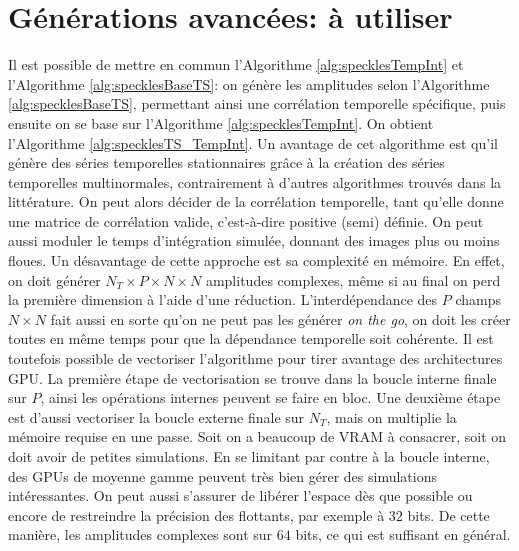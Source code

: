\documentclass[MSc,french]{ulthese}
\begin{document}
\section{Générations avancées: à utiliser}
Il est possible de mettre en commun l'Algorithme \ref{alg:specklesTempInt} et l'Algorithme \ref{alg:specklesBaseTS}: on génère les amplitudes selon l'Algorithme \ref{alg:specklesBaseTS}, permettant ainsi une corrélation temporelle spécifique, puis ensuite on se base sur l'Algorithme \ref{alg:specklesTempInt}. On obtient l'Algorithme \ref{alg:specklesTS_TempInt}. Un avantage de cet algorithme est qu'il génère des séries temporelles stationnaires grâce à la création des séries temporelles multinormales, contrairement à d'autres algorithmes trouvés dans la littérature. On peut alors décider de la corrélation temporelle, tant qu'elle donne une matrice de corrélation valide, c'est-à-dire positive (semi) définie. On peut aussi moduler le temps d'intégration simulée, donnant des images plus ou moins floues. Un désavantage de cette approche est sa complexité en mémoire. En effet, on doit générer $N_T \times P \times N \times N$ amplitudes complexes, même si au final on perd la première dimension à l'aide d'une réduction. L'interdépendance des $P$ champs $N\times N$ fait aussi en sorte qu'on ne peut pas les générer \textit{on the go}, on doit les créer toutes en même temps pour que la dépendance temporelle soit cohérente. Il est toutefois possible de vectoriser l'algorithme pour tirer avantage des architectures GPU. La première étape de vectorisation se trouve dans la boucle interne finale sur $P$, ainsi les opérations internes peuvent se faire en bloc. Une deuxième étape est d'aussi vectoriser la boucle externe finale sur $N_T$, mais on multiplie la mémoire requise en une passe. Soit on a beaucoup de VRAM à consacrer, soit on doit avoir de petites simulations. En se limitant par contre à la boucle interne, des GPUs de moyenne gamme peuvent très bien gérer des simulations intéressantes. On peut aussi s'assurer de libérer l'espace dès que possible ou encore de restreindre la précision des flottants, par exemple à $32$ bits. De cette manière, les amplitudes complexes sont sur $64$ bits, ce qui est suffisant en général.
\end{document}
